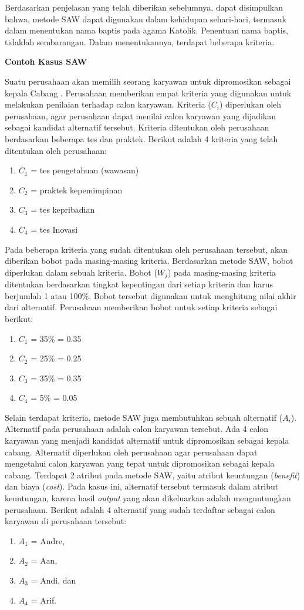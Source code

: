 \documentclass[a4paper,twoside]{article}
\begin{document}
\begin{enumerate}
	Berdasarkan penjelasan yang telah diberikan sebelumnya, dapat disimpulkan bahwa, metode SAW dapat digunakan dalam kehidupan sehari-hari, termasuk dalam menentukan nama baptis pada agama Katolik. Penentuan nama baptis, tidaklah sembarangan. Dalam menentukannya, terdapat beberapa kriteria.

\textbf{Contoh Kasus SAW}
	
	Suatu perusahaan akan memilih seorang karyawan untuk dipromosikan sebagai kepala Cabang \cite{contohsaw}. Perusahaan memberikan empat kriteria yang digunakan untuk melakukan penilaian terhadap calon karyawan. Kriteria ($C_{i}$) diperlukan oleh perusahaan, agar perusahaan dapat menilai calon karyawan yang dijadikan sebagai kandidat alternatif tersebut. Kriteria ditentukan oleh perusahaan berdasarkan beberapa tes dan praktek. Berikut adalah 4 kriteria yang telah ditentukan oleh perusahaan:
\begin{enumerate}
	\item $C_{1}$ = tes pengetahuan (wawasan)
	\item $C_{2}$ = praktek kepemimpinan
	\item $C_{3}$ = tes kepribadian
	\item $C_{4}$ = tes Inovasi
\end{enumerate}
Pada beberapa kriteria yang sudah ditentukan oleh perusahaan tersebut, akan diberikan bobot pada masing-masing kriteria. Berdasarkan metode SAW, bobot diperlukan dalam sebuah kriteria. Bobot ($W_{j}$) pada masing-masing kriteria ditentukan berdasarkan tingkat kepentingan dari setiap kriteria dan harus berjumlah 1 atau 100\%. Bobot tersebut digunakan untuk menghitung nilai akhir dari alternatif. Perusahaan memberikan bobot untuk setiap kriteria sebagai berikut:
\begin{enumerate}
	\item $C_{1}$ = 35\% = 0.35
	\item $C_{2}$ = 25\% = 0.25
	\item $C_{3}$ = 35\% = 0.35
	\item $C_{4}$ = 5\% = 0.05
\end{enumerate}
Selain terdapat kriteria, metode SAW juga membutuhkan sebuah alternatif ($A_{i}$). Alternatif pada perusahaan adalah calon karyawan tersebut. Ada 4 calon karyawan yang menjadi kandidat alternatif untuk dipromosikan sebagai kepala cabang. Alternatif diperlukan oleh perusahaan agar perusahaan dapat mengetahui calon karyawan yang tepat untuk dipromosikan sebagai kepala cabang. Terdapat 2 atribut pada metode SAW, yaitu atribut keuntungan (\textit{benefit}) dan biaya (\textit{cost}). Pada kasus ini, alternatif tersebut termasuk dalam atribut keuntungan, karena hasil \textit{output} yang akan dikeluarkan adalah menguntungkan perusahaan. Berikut adalah 4 alternatif yang sudah terdaftar sebagai calon karyawan di perusahaan tersebut:
\begin{enumerate}
	\item $A_{1}$ = Andre,
	\item $A_{2}$ = Aan,
	\item $A_{3}$ = Andi, dan
	\item $A_{4}$ = Arif.
\end{enumerate}


\end{enumerate}
\end{document}
